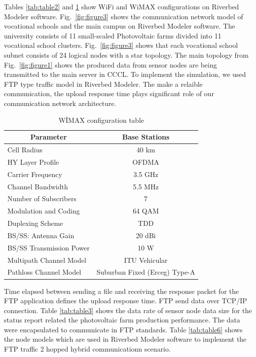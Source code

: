 \documentclass[conference, letterpaper]{IEEEtran}
\begin{document}
Tables \ref{tab:table2} and \ref{tab:table4} show WiFi and WiMAX configurations on Riverbed Modeler software. Fig.~\ref{fig:figure3} shows the communication network model of vocational schools and the main campus on Riverbed Modeler software. The university consists of 11 small-scaled Photovoltaic farms divided into 11 vocational school clusters. Fig.~\ref{fig:figure3} shows that each vocational school subnet consists of 24 logical nodes with a star topology. The main topology from Fig.~\ref{fig:figure1} shows the produced data from sensor nodes are being transmitted to the main server in CCCL. To implement the simulation, we used FTP type traffic model in Riverbed Modeler. The make a relaible communication, the upload response time plays significant role of our communication network architecture.
\begin{table}[htbp]
\caption{WİMAX configuration table}
\centering
\label{tab:table4}
\begin{tabular}{lc}
\hline
\multicolumn{1}{c}{Parameter} & Base Stations                 \\ \hline
Cell Radius                   & 40 km                         \\
HY Layer Profile              & OFDMA                         \\
Carrier Frequency             & 3.5 GHz                       \\
Channel Bandwidth             & 5.5 MHz                       \\
Number of Subscribers         & 7                             \\
Modulation and Coding         & 64 QAM                        \\
Duplexing Scheme              & TDD                           \\
BS/SS: Antenna Gain           & 20 dBi                        \\
BS/SS Transmission Power      & 10 W                          \\
Multipath Channel Model       & ITU Vehicular                 \\
Pathloss Channel Model        & Suburban Fixed (Erceg) Type-A \\ \hline
\end{tabular}
\end{table}

Time elapsed between sending a file and receiving the response packet for the FTP application defines the upload response time. FTP send data over TCP/IP connection. Table \ref{tab:table3} shows the data rate of sensor node data size for the status report related the photovoltaic farm production performance. The data were encapsulated to communicate in FTP standards. Table \ref{tab:table6} shows the node models which are used in Riverbed Modeler software to implement the FTP traffic 2 hopped hybrid communicationn scenario. 
\end{document}
